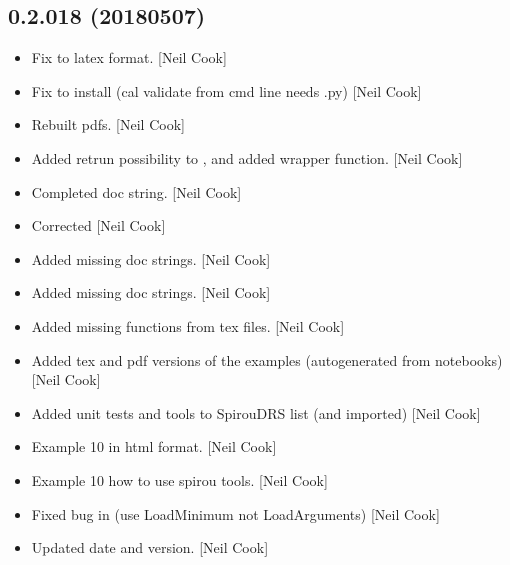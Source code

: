 \documentclass[a4paper,10pt,english]{report}
\begin{document}
\subsection{0.2.018 (2018\sphinxhyphen{}05\sphinxhyphen{}07)}
\label{\detokenize{misc/changelog:id462}}\begin{itemize}
\item {} 
Fix to latex format. {[}Neil Cook{]}

\item {} 
Fix to install (cal validate from cmd line needs .py) {[}Neil Cook{]}

\item {} 
Rebuilt pdfs. {[}Neil Cook{]}

\item {} 
Added retrun possibility to , and added
 wrapper function. {[}Neil Cook{]}

\item {} 
Completed doc string. {[}Neil Cook{]}

\item {} 
Corrected  {[}Neil Cook{]}

\item {} 
Added missing doc strings. {[}Neil Cook{]}

\item {} 
Added missing doc strings. {[}Neil Cook{]}

\item {} 
Added missing functions from tex files. {[}Neil Cook{]}

\item {} 
Added tex and pdf versions of the examples (auto\sphinxhyphen{}generated from
notebooks) {[}Neil Cook{]}

\item {} 
Added unit tests and tools to SpirouDRS  list (and imported)
{[}Neil Cook{]}

\item {} 
Example 10 in html format. {[}Neil Cook{]}

\item {} 
Example 10 \sphinxhyphen{} how to use spirou tools. {[}Neil Cook{]}

\item {} 
Fixed bug in  (use LoadMinimum not LoadArguments) {[}Neil
Cook{]}

\item {} 
Updated date and version. {[}Neil Cook{]}


\end{itemize}
\end{document}
